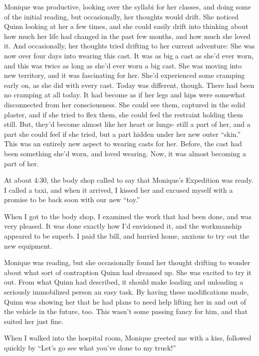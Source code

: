 \begin{thought}
Monique was productive, looking over the syllabi for her classes, and doing some of the
initial reading, but occasionally, her thoughts would drift. She noticed Quinn looking at her a
few times, and she could easily drift into thinking about how much her life had changed in the
past few months, and how much she loved it. And occasionally, her thoughts tried drifting to her
current adventure: She was now over four days into wearing this cast. It was as big a cast as
she'd ever worn, and this was twice as long as she'd ever worn a big cast. She was moving into
new territory, and it was fascinating for her. She'd experienced some cramping early on, as she
did with every cast. Today was different, though. There had been no cramping at all today. It
had become as if her legs and hips were somewhat disconnected from her consciousness. She could
see them, captured in the solid plaster, and if she tried to flex them, she could feel the
restraint holding them still. But, they'd become almost like her heart or lungs- still a part of
her, and a part she could feel if she tried, but a part hidden under her new outer ``skin.''
This
was an entirely new aspect to wearing casts for her. Before, the cast had been something she'd
worn, and loved wearing. Now, it was almost becoming a part of her.
\end{thought}

At about 4:30, the body shop called to say that Monique's Expedition was ready. I called a
taxi, and when it arrived, I kissed her and excused myself with a promise to be back soon with
our new ``toy.''

When I got to the body shop, I examined the work that had been done, and was very pleased.
It was done exactly how I'd envisioned it, and the workmanship appeared to be superb. I paid the
bill, and hurried home, anxious to try out the new equipment.

Monique was reading, but she occasionally found her thought drifting to wonder about what
sort of contraption Quinn had dreamed up. She was excited to try it out. From what Quinn had
described, it should make loading and unloading a seriously immobilized person an easy task. By
having these modifications made, Quinn was showing her that he had plans to need help lifting
her in and out of the vehicle in the future, too. This wasn't some passing fancy for him, and
that suited her just fine.

When I walked into the hospital room, Monique greeted me with a kiss, followed quickly by
``Let's go see what you've done to my truck!''

